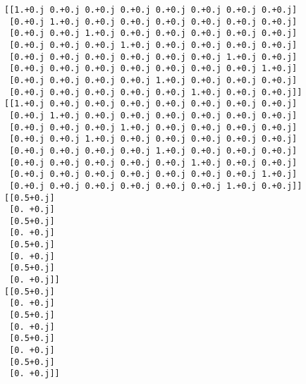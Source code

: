 \documentclass[11pt]{article}
\begin{document}
    \begin{Verbatim}[commandchars=\\\{\}]
[[1.+0.j 0.+0.j 0.+0.j 0.+0.j 0.+0.j 0.+0.j 0.+0.j 0.+0.j]
 [0.+0.j 1.+0.j 0.+0.j 0.+0.j 0.+0.j 0.+0.j 0.+0.j 0.+0.j]
 [0.+0.j 0.+0.j 1.+0.j 0.+0.j 0.+0.j 0.+0.j 0.+0.j 0.+0.j]
 [0.+0.j 0.+0.j 0.+0.j 1.+0.j 0.+0.j 0.+0.j 0.+0.j 0.+0.j]
 [0.+0.j 0.+0.j 0.+0.j 0.+0.j 0.+0.j 0.+0.j 1.+0.j 0.+0.j]
 [0.+0.j 0.+0.j 0.+0.j 0.+0.j 0.+0.j 0.+0.j 0.+0.j 1.+0.j]
 [0.+0.j 0.+0.j 0.+0.j 0.+0.j 1.+0.j 0.+0.j 0.+0.j 0.+0.j]
 [0.+0.j 0.+0.j 0.+0.j 0.+0.j 0.+0.j 1.+0.j 0.+0.j 0.+0.j]]
[[1.+0.j 0.+0.j 0.+0.j 0.+0.j 0.+0.j 0.+0.j 0.+0.j 0.+0.j]
 [0.+0.j 1.+0.j 0.+0.j 0.+0.j 0.+0.j 0.+0.j 0.+0.j 0.+0.j]
 [0.+0.j 0.+0.j 0.+0.j 1.+0.j 0.+0.j 0.+0.j 0.+0.j 0.+0.j]
 [0.+0.j 0.+0.j 1.+0.j 0.+0.j 0.+0.j 0.+0.j 0.+0.j 0.+0.j]
 [0.+0.j 0.+0.j 0.+0.j 0.+0.j 1.+0.j 0.+0.j 0.+0.j 0.+0.j]
 [0.+0.j 0.+0.j 0.+0.j 0.+0.j 0.+0.j 1.+0.j 0.+0.j 0.+0.j]
 [0.+0.j 0.+0.j 0.+0.j 0.+0.j 0.+0.j 0.+0.j 0.+0.j 1.+0.j]
 [0.+0.j 0.+0.j 0.+0.j 0.+0.j 0.+0.j 0.+0.j 1.+0.j 0.+0.j]]
[[0.5+0.j]
 [0. +0.j]
 [0.5+0.j]
 [0. +0.j]
 [0.5+0.j]
 [0. +0.j]
 [0.5+0.j]
 [0. +0.j]]
[[0.5+0.j]
 [0. +0.j]
 [0.5+0.j]
 [0. +0.j]
 [0.5+0.j]
 [0. +0.j]
 [0.5+0.j]
 [0. +0.j]]
    \end{Verbatim}
\end{document}
